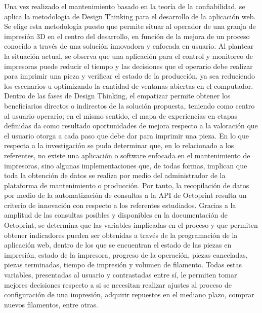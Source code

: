 Una vez realizado el mantenimiento basado en la teoría de la confiabilidad, se aplica la metodología de Design Thinking para el desarrollo de la aplicación web. Se elige esta metodología puesto que permite situar al operador de una granja de impresión 3D en el centro del desarrollo, en función de la mejora de un proceso conocido a través de una solución innovadora y enfocada en usuario. Al plantear la situación actual, se observa que una aplicación para el control y monitoreo de impresoras puede reducir el tiempo y las decisiones que el operario debe realizar para imprimir una pieza y verificar el estado de la producción, ya sea reduciendo los escenarios u optimizando la cantidad de ventanas abiertas en el computador. Dentro de las fases de Design Thinking, el empatizar permite obtener los beneficiarios directos o indirectos de la solución propuesta, teniendo como centro al usuario operario; en el mismo sentido, el mapa de experiencias en etapas definidas da como resultado oportunidades de mejora respecto a la valoración que el usuario otorga a cada paso que debe dar para imprimir una pieza. En lo que respecta a la investigación se pudo determinar que, en lo relacionado a los referentes, no existe una aplicación o software enfocada en el mantenimiento de impresoras, sino algunas implementaciones que, de todas formas, implican que toda la obtención de datos se realiza por medio del administrador de la plataforma de mantenimiento o producción. Por tanto, la recopilación de datos por medio de la automatización de consultas a la API de Octoprint resulta un criterio de innovación con respecto a los referentes estudiados. Gracias a la amplitud de las consultas posibles y disponibles en la documentación de Octoprint, se determina que las variables implicadas en el proceso y que permiten obtener indicadores pueden ser obtenidas a través de la programación de la aplicación web, dentro de los que se encuentran el estado de las piezas en impresión, estado de la impresora, progreso de la operación, piezas canceladas, piezas terminadas, tiempo de impresión y volumen de filamento. Todas estas variables, presentadas al usuario y contrastadas entre sí, le permiten tomar mejores decisiones respecto a si se necesitan realizar ajustes al proceso de configuración de una impresión, adquirir repuestos en el mediano plazo, comprar nuevos filamentos, entre otras.
